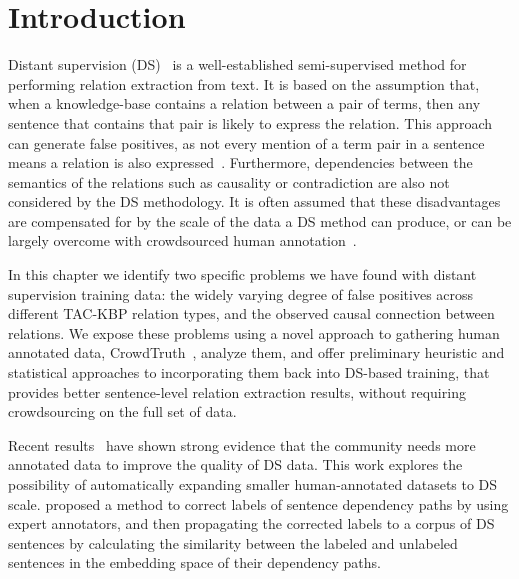 \section{Introduction}


Distant supervision (DS)~\cite{mintz2009distant,Welty:2010:LSR} is a well-established semi-supervised method for performing relation extraction from text. It is based on the assumption that, when a knowledge-base contains a relation between a pair of terms, then any sentence that contains that pair is likely to express the relation. This approach can generate false positives, as not every mention of a term pair in a sentence means a relation is also expressed~\cite{DBLP:conf/ijcai/FengGQLL17}. Furthermore, dependencies between the semantics of the relations such as causality or contradiction are also not considered by the DS methodology. It is often assumed that these disadvantages are compensated for by the scale of the data a DS method can produce, or can be largely overcome with crowdsourced human annotation~\cite{angeli2014combining}.  

In this chapter we identify two specific problems we have found with distant supervision training data: the widely varying degree of false positives across different TAC-KBP relation types, and the observed causal connection between relations. We expose these problems using a novel approach to gathering human annotated data, CrowdTruth~\cite{aroyo2014threesides,aroyo2015truth,aroyo2013crowd}, analyze them, and offer preliminary heuristic and statistical approaches to incorporating them back into DS-based training, that provides better sentence-level relation extraction results, without requiring crowdsourcing on the full set of data.



Recent results~\cite{angeli2014combining,liu2016effective} have shown strong evidence that the community needs more annotated data to improve the quality of DS data. This work explores the possibility of automatically expanding smaller human-annotated datasets to DS scale. \citet{sterckx2016knowledge} proposed a method to correct labels of sentence dependency paths by using expert annotators, and then propagating the corrected labels to a corpus of DS sentences by calculating the similarity between the labeled and unlabeled sentences in the embedding space of their dependency paths.

